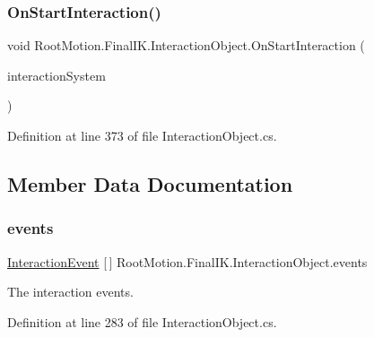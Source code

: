 \subsubsection{\texorpdfstring{On\+Start\+Interaction()}{OnStartInteraction()}}
{\footnotesize\ttfamily void Root\+Motion.\+Final\+I\+K.\+Interaction\+Object.\+On\+Start\+Interaction (\begin{DoxyParamCaption}\item[{\mbox{\hyperlink{class_root_motion_1_1_final_i_k_1_1_interaction_system}{Interaction\+System}}}]{interaction\+System }\end{DoxyParamCaption})}



Definition at line 373 of file Interaction\+Object.\+cs.



\subsection{Member Data Documentation}
\mbox{\label{class_root_motion_1_1_final_i_k_1_1_interaction_object_a604315fc84c3269ff2c0a804dec65df4}} 
\subsubsection{\texorpdfstring{events}{events}}
{\footnotesize\ttfamily \mbox{\hyperlink{class_root_motion_1_1_final_i_k_1_1_interaction_object_1_1_interaction_event}{Interaction\+Event}} \mbox{[}$\,$\mbox{]} Root\+Motion.\+Final\+I\+K.\+Interaction\+Object.\+events}



The interaction events. 



Definition at line 283 of file Interaction\+Object.\+cs.

\mbox{\label{class_root_motion_1_1_final_i_k_1_1_interaction_object_adbff188ad1baf1072b8db4e80a8d7ec4}} 
